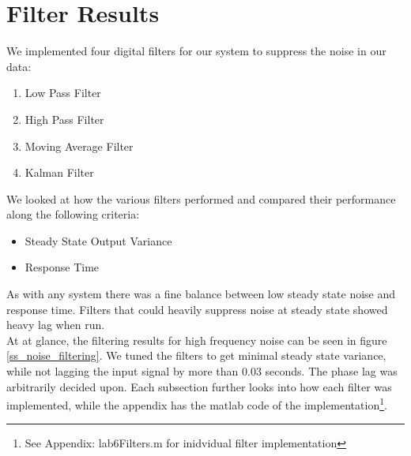 \documentclass{article}
\theoremstyle{plain}
\theoremstyle{definition}
\theoremstyle{remark}
\begin{document}
\clearpage

\section{Filter Results}
We implemented four digital filters for our system to suppress the noise in our data:
\begin{enumerate}
\item Low Pass Filter
\item High Pass Filter
\item Moving Average Filter
\item Kalman Filter
\end{enumerate}
We looked at how the various filters performed and compared their performance along the following criteria:
\begin{itemize}
\item Steady State Output Variance

\item Response Time
\end{itemize}
As with any system there was a fine balance between low steady state noise and response time. Filters that could heavily suppress noise at steady state showed heavy lag when run.\\

At at glance, the filtering results for high frequency noise can be seen in figure \ref{ss_noise_filtering}. We tuned the filters to get minimal steady state variance, while not lagging the input signal by more than 0.03 seconds. The phase lag was arbitrarily decided upon. Each subsection further looks into how each filter was implemented, while the appendix has the matlab code of the implementation\footnote{See Appendix: lab6Filters.m for inidvidual filter implementation}. 
\end{document}
